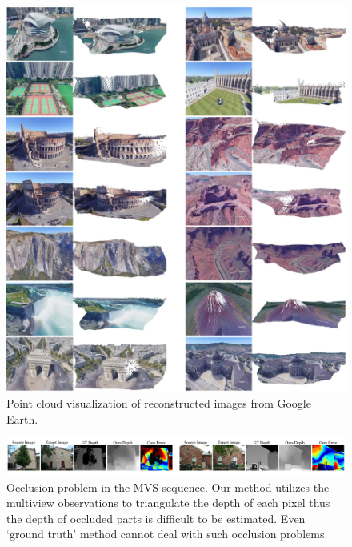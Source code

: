 \documentclass[letterpaper, 10 pt, conference]{ieeeconf}  %
\begin{document}
\begin{figure}[h]
\begin{center}
\includegraphics[width=0.9\linewidth]{figs/google_earth_re_pointcloud.pdf}
\end{center}
    \caption{Point cloud visualization of reconstructed images from Google Earth.}
\label{fig:pointcloud}
\end{figure}
 
\begin{figure}[h]
\centering
\includegraphics[width=1.0\linewidth]{figs/occlusion.pdf}
\caption{Occlusion problem in the MVS sequence. Our method utilizes the multiview observations to triangulate the depth of each pixel thus the depth of occluded parts is difficult to be estimated. Even `ground truth' method cannot deal with such occlusion problems.}
\label{fig:occlusion}
\end{figure}
 
\end{document}
